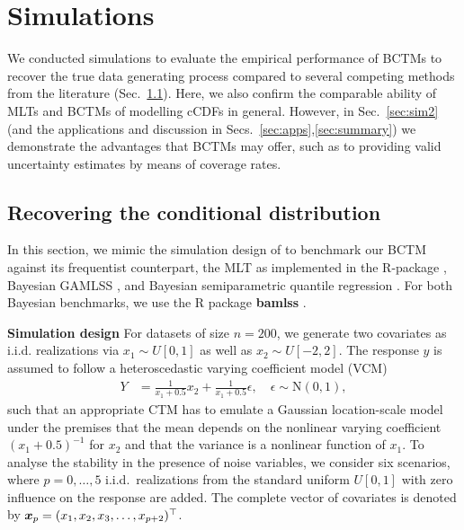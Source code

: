\documentclass[12pt]{article}
\theoremstyle{plain}
\begin{document}
\section{Simulations}\label{sec:sims}

We conducted simulations to evaluate the empirical performance of BCTMs to recover the true data generating process compared to several competing methods from the literature (Sec.~\ref{sec:sim1}). Here, we also confirm the comparable ability of MLTs and BCTMs of modelling cCDFs in general. However, in Sec.~\ref{sec:sim2} (and the applications and discussion in Secs.~\ref{sec:apps},\ref{sec:summary}) we demonstrate the advantages that BCTMs may offer, such as to providing valid uncertainty estimates by means of coverage rates. %

\subsection{Recovering the conditional distribution}\label{sec:sim1}

In this section, we mimic the simulation design of \citet{hothorn2014} to benchmark our BCTM against its frequentist counterpart, the MLT as implemented in the R-package  \citep[\textbf{mlt},][]{hothorn2017package}, Bayesian GAMLSS \citep{klein2015bayesian}, and Bayesian semiparametric quantile regression \citep{waldmann2013bayesian}. For both Bayesian benchmarks, we use the R package \textbf{bamlss} \citep{umlauf2018bamlss}.

\noindent\textbf{Simulation design}
For datasets of size $n=200$, we generate two covariates  as i.i.d. realizations via $x_1 \sim U[0,1]$ as well as $x_2 \sim U[-2,2]$. The response $y$ is assumed to follow a heteroscedastic varying coefficient model (VCM)
\begin{align}\label{sim_vcm}
Y &= \frac{1}{x_1 + 0.5} x_2 + \frac{1}{x_1 +0.5}\epsilon, \quad \epsilon \sim \mathrm{N}(0,1),
\end{align}
such that an appropriate CTM has to emulate a Gaussian location-scale model under the premises that the mean depends on the nonlinear varying coefficient $(x_1+0.5)^{-1}$ for $x_2$ and that the variance is a nonlinear function of $x_1$. To analyse the stability in the presence of noise variables, we consider six scenarios, where $p = 0, \ldots, 5$ i.i.d.~realizations from the standard uniform $U[0,1]$ with zero influence on the response are added. The complete vector of covariates is denoted by $\text{\boldmath$x$}_p = (x_1, x_2, x_3, \ldots, x_{p+2})^\top$.
\end{document}
